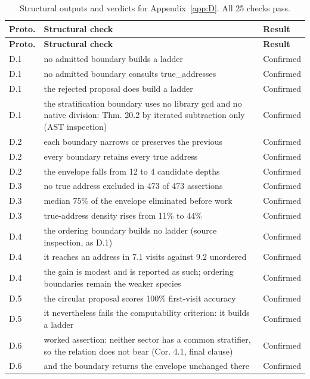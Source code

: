 \documentclass[pdflatex,sn-mathphys-num]{sn-jnl}
\theoremstyle{thmstyleone}%
\theoremstyle{thmstyletwo}%
\theoremstyle{thmstylethree}%
\begin{document}
\begin{appendices}
\begingroup\small\renewcommand{\arraystretch}{1.25}
\begin{longtable}{@{} p{} p{} p{} @{}}
\caption{Structural outputs and verdicts for Appendix~\ref{app:D}. All 25 checks pass.}\label{tab:appD_results}\\
\toprule
\textbf{Proto.} & \textbf{Structural check} & \textbf{Result} \\
\midrule
\endfirsthead
\toprule
\textbf{Proto.} & \textbf{Structural check} & \textbf{Result} \\
\midrule
\endhead
\bottomrule
\endfoot
D.1 & no admitted boundary builds a ladder & Confirmed \\
D.1 & no admitted boundary consults true\_addresses & Confirmed \\
D.1 & the rejected proposal does build a ladder & Confirmed \\
D.1 & the stratification boundary uses no library gcd and no native division: Thm. 20.2 by iterated subtraction only (AST inspection) & Confirmed \\
D.2 & each boundary narrows or preserves the previous & Confirmed \\
D.2 & every boundary retains every true address & Confirmed \\
D.2 & the envelope falls from 12 to 4 candidate depths & Confirmed \\
D.3 & no true address excluded in 473 of 473 assertions & Confirmed \\
D.3 & median 75\% of the envelope eliminated before work & Confirmed \\
D.3 & true-address density rises from 11\% to 44\% & Confirmed \\
D.4 & the ordering boundary builds no ladder (source inspection, as D.1) & Confirmed \\
D.4 & it reaches an address in 7.1 visits against 9.2 unordered & Confirmed \\
D.4 & the gain is modest and is reported as such; ordering boundaries remain the weaker species & Confirmed \\
D.5 & the circular proposal scores 100\% first-visit accuracy & Confirmed \\
D.5 & it nevertheless fails the computability criterion: it builds a ladder & Confirmed \\
D.6 & worked assertion: neither sector has a common stratifier, so the relation does not bear (Cor. 4.1, final clause) & Confirmed \\
D.6 & and the boundary returns the envelope unchanged there & Confirmed \\

\end{longtable}
\end{appendices}
\end{document}
